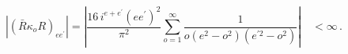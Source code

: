 \begin{equation}
|(\bar{R}\kappa _{o}R)_{ee^{\prime }}|=\left|{\frac{16\,i^{e+e^{\prime }}
\left(ee^{\prime }\right)^2 }{\pi ^{2}}}\sum_{o=1}^{\infty }{\frac{1}{
o(e^2-o^{2})(e^{\prime 2}-o^2)}}\right|\quad <\infty \,.
\end{equation}

